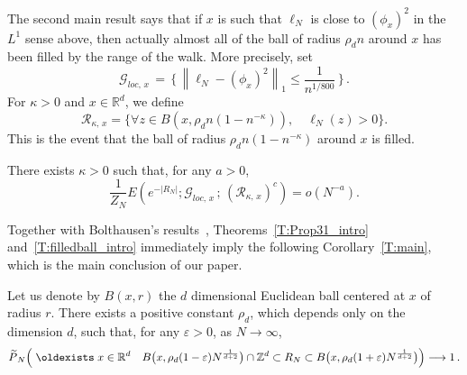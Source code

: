 \documentclass[AHL, Unicode, longabstracts, published]{cedram}
\newcommand*\Zd {{\mathbb Z^d}}
\newcommand*\Rd {{\mathbb R^d}}
\newcommand*\R{\mathbb{R}}
\newcommand*\E {{E}}
\newcommand*\wP{\smash{\widetilde P}}
\newcommand{\cG}{\mathcal{G}}
\newcommand{\cR}{\mathcal{R}}
\renewcommand*{\exists}{\mathrel{\oldexists}}
\let\oldforall\forall
\renewcommand*{\forall}{\mathrel{\oldforall}}
\begin{document}
The second main result says that if $x$ is such that $\ell_N$ is close to $(\phi_x)^2$ in the $L^1$ sense above, then actually almost all of the ball of radius $\rho_d n$ around $x$ has been filled by the range of the walk. More precisely, set
\[
\cG_{loc,\,x}\,=\,\Big\{\, \left\|\ell_N - (\phi_x)^2 \right\|_1 \le \frac{1}{n^{1/800}}\,\Big\}\,.
\]
For $\kappa>0$ and $x \in \R^d$, we define
\[
\cR_{\kappa,\,x} = \big\{\forall z \in B(x, \rho_d n (1 - n^{- \kappa})),\quad \ell_N(z)>0 \big \}.
\]
This is the event that the ball of radius $\rho_d n (1 - n^{-\kappa})$ around $x$ is filled.

\begin{theo}\label{T:filledball_intro}
There exists $\kappa>0$ such that, for any $a>0$,
\[
\frac1{Z_N}\E\left(e^{ - |R_N|} ; \cG_{loc,\,x}\,;\,(\cR_{\kappa,\,x})^c\right) = o(N^{-a}).
\]
\end{theo}

Together with Bolthausen's results~\cite[see p.~877, immediately below Conjecture~1.3]{BO}, Theorems~\ref{T:Prop31_intro} and~\ref{T:filledball_intro} immediately imply the following Corollary~\ref{T:main}, which is the main conclusion of our paper.

\begin{coro}\label{T:main}
Let us denote by $B(x,r)$ the $d$ dimensional Euclidean ball centered at $x$ of radius $r$. There exists a positive constant $\rho_d$, which depends only on the dimension $d$, such that, for any $\varepsilon>0$, as $N \to \infty$,
\[
\wP_N\Big(\exists x\in\Rd\quad B\big(x,\rho_d(1-\varepsilon)N^{\frac{1}{d+2}}\big)
\cap\Zd
\subset R_N
\subset
B\big(x,\rho_d(1+\varepsilon)N^{\frac{1}{d+2}}\big)\Big)\longrightarrow 1\,.
\]
\end{coro}
\end{document}
